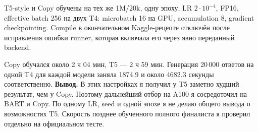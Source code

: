 T5-style и Copy обучены на тех же 1M/20k, одну эпоху, LR
$2\cdot10^{-4}$, FP16, effective batch 256 на двух T4:
microbatch 16 на GPU, accumulation 8, gradient checkpointing.
Compile в окончательном Kaggle-рецепте отключён после исправления
ошибки runner, которая включала его через явно переданный backend.

\begin{table}[htbp]
\centering\small
\caption{Завершённые T5/Copy на Kaggle после одной эпохи.
Beam 4, 20\,000 validation, 19\,886 допустимых эталонов.}
\end{table}

Copy обучался около 2 ч 04 мин, T5 --- 2 ч 59 мин.
Генерация 20\,000 ответов на одной T4 для каждой модели заняла
1874.9 и около 4682.3 секунды соответственно.
\textbf{Вывод.} В этих настройках я получил у T5 заметно худший результат,
чем у Copy. Поэтому дальнейший отбор на A100 я сосредоточил на BART
и Copy. По одному LR, seed и одной эпохе я не делаю общего вывода
о возможностях T5. Скорость позднее обученного полного финалиста
я проверил отдельно на официальном тесте.

